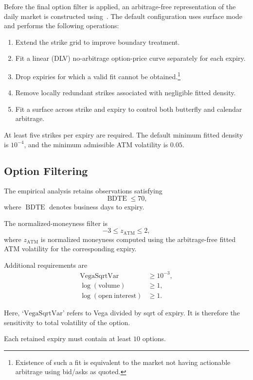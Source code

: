 \documentclass[11pt,a4paper]{article}
\begin{document}
Before the final option filter is applied, an arbitrage-free representation of the daily market is constructed using~\citet{SANOS2026}. The default configuration uses surface mode and performs the following operations:
%
\begin{enumerate}
    \item Extend the strike grid to improve boundary treatment.
    \item Fit a linear (DLV) no-arbitrage option-price curve separately for each expiry.
    \item Drop expiries for which a valid fit cannot be obtained.\footnote{
        Existence of such a fit is equivalent to the market not having actionable arbitrage
        using bid/asks as quoted.
    }
    \item Remove locally redundant strikes associated with negligible fitted density.
    \item Fit a surface across strike and expiry to control both butterfly and calendar arbitrage.
\end{enumerate}

At least five strikes per expiry are required. The default minimum fitted density is \(10^{-4}\), and the minimum admissible ATM volatility is \(0.05\).

\subsection{Option Filtering}

The empirical analysis retains observations satisfying
%
\[
    \operatorname{BDTE} \leq 70,
\]
%
where \(\operatorname{BDTE}\) denotes business days to expiry.

The normalized-moneyness filter is
%
\[
    -3 \leq z_{\mathrm{ATM}} \leq 2,
\]
%
where \(z_{\mathrm{ATM}}\) is normalized moneyness computed using the
arbitrage-free fitted ATM volatility for the corresponding expiry.

Additional requirements are
%
\[
\begin{aligned}
    \mathrm{VegaSqrtVar} &\geq 10^{-3}, \\
    \log(\mathrm{volume}) &\geq 1, \\
    \log(\mathrm{open\ interest}) &\geq 1.
\end{aligned}
\]

Here, `$\mathrm{VegaSqrtVar}$' refers to Vega divided by sqrt of expiry. It is therefore
the sensitivity to total volatility of the option.

Each retained expiry must contain at least \(10\) options.
\end{document}
